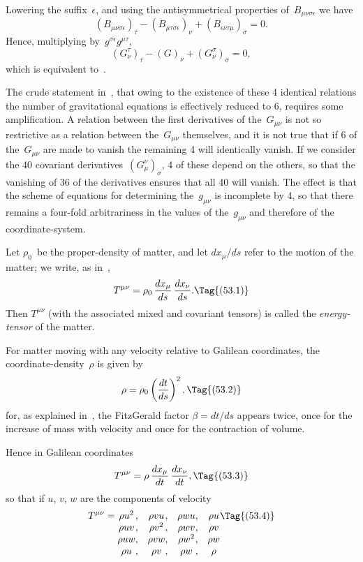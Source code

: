 \documentclass[12pt]{book}
\begin{document}
Lowering the suffix~$\epsilon$, and using the antisymmetrical properties of~$B_{\mu\nu\sigma\epsilon}$ we have
\[
(B_{\mu\nu\sigma\epsilon})_\tau - (B_{\mu\tau\sigma\epsilon})_\nu + (B_{\epsilon\nu\tau\mu})_\sigma = 0.
\]
Hence, multiplying by~$g^{\sigma\epsilon}g^{\mu\tau}$,
\[
(G^\tau_\nu)_\tau - (G)_\nu + (G^\sigma_\nu)_\sigma = 0,
\]
which is equivalent to~.

The crude statement in~, that owing to the existence of these 4 identical relations the number of
gravitational equations is effectively reduced to 6, requires some amplification.
A relation between the first derivatives of the~$G_{\mu\nu}$ is not so restrictive as a relation between
the~$G_{\mu\nu}$ themselves, and it is not true that if 6 of the~$G_{\mu\nu}$ are made to vanish the remaining 4 will
identically vanish.
If we consider the 40 covariant derivatives~$(G^\nu_\mu)_\sigma$, 4 of these depend on the others, so that the
vanishing of 36 of the derivatives ensures that all 40 will vanish.
The effect is that the scheme of equations for determining the~$g_{\mu\nu}$ is incomplete by 4,
so that there remains a four-fold arbitrariness in the values of the~$g_{\mu\nu}$ and therefore of
the coordinate-system.

%
%

Let $\rho_{0}$~be the proper-density of matter, and let $dx_{\mu}/ds$ refer to the motion
of the matter; we write, as in~,
\[
T^{\mu\nu} = \rho_{0}\, \frac{dx_{\mu}}{ds}\, \frac{dx_{\nu}}{ds}.
\Tag{(53.1)}
\]
Then $T^{\mu\nu}$ (with the associated mixed and covariant tensors) is called the
\emph{energy-tensor} of the matter.

For matter moving with any velocity relative to Galilean coordinates, the
coordinate-density~$\rho$ is given by
\[
\rho = \rho_{0} \left(\frac{dt}{ds}\right)^{2},
\Tag{(53.2)}
\]
for, as explained in~, the FitzGerald factor $\beta = dt/ds$ appears twice, once
for the increase of mass with velocity and once for the contraction of volume.

Hence in Galilean coordinates
\[
T^{\mu\nu} = \rho\, \frac{dx_{\mu}}{dt}\, \frac{dx_{\nu}}{dt},
\Tag{(53.3)}
\]
so that if $u$, $v$, $w$ are the components of velocity
\[
T^{\mu\nu} =
\begin{array}[t]{@{}c@{,\quad}c@{,\quad}c@{,\quad}c@{}}
  \rho u^{2} & \rho v u & \rho w u & \rho u\\
  \rho u v & \rho v^{2} & \rho w v & \rho v\\
  \rho u w & \rho v w & \rho w^{2} & \rho w\\
  \rho u & \rho v & \rho w & \rho\\
\end{array}
\Tag{(53.4)}
\]
\end{document}
